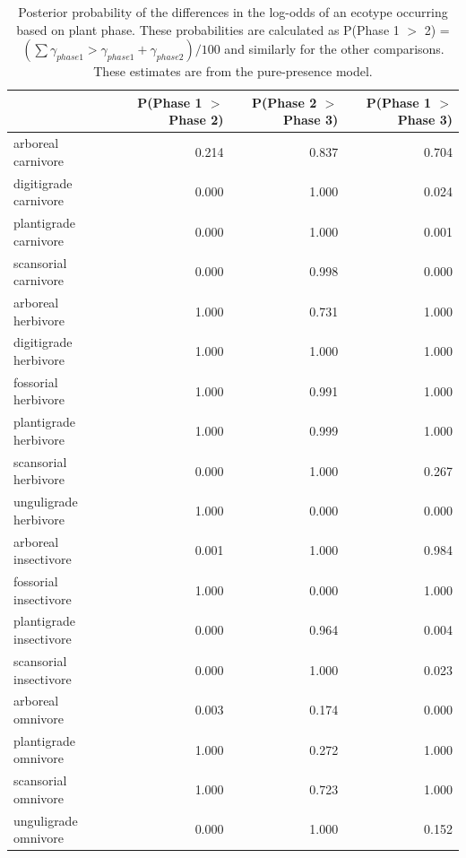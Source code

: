 \documentclass[12pt,letterpaper]{article}
\begin{document}
\begin{table}[ht]
  \centering
  \caption[Posterior probablity estimates of differences in occurrence by plant phase]{Posterior probability of the differences in the log-odds of an ecotype occurring based on plant phase. These probabilities are calculated as P(Phase 1 \(>\) 2) = \( (\sum \gamma_{phase 1} > \gamma_{phase 1} + \gamma_{phase 2}) / 100\) and similarly for the other comparisons. These estimates are from the pure-presence model.}
  \label{tab:occur_plant}
  \begin{tabular}{ l r r r }
    \hline
    & P(Phase 1 $>$ Phase 2) & P(Phase 2 $>$ Phase 3) & P(Phase 1 $>$ Phase 3) \\ 
    \hline
    arboreal carnivore & 0.214 & 0.837 & 0.704 \\ 
    digitigrade carnivore & 0.000 & 1.000 & 0.024 \\ 
    plantigrade carnivore & 0.000 & 1.000 & 0.001 \\ 
    scansorial carnivore & 0.000 & 0.998 & 0.000 \\ 
    arboreal herbivore & 1.000 & 0.731 & 1.000 \\ 
    digitigrade herbivore & 1.000 & 1.000 & 1.000 \\ 
    fossorial herbivore & 1.000 & 0.991 & 1.000 \\ 
    plantigrade herbivore & 1.000 & 0.999 & 1.000 \\ 
    scansorial herbivore & 0.000 & 1.000 & 0.267 \\ 
    unguligrade herbivore & 1.000 & 0.000 & 0.000 \\ 
    arboreal insectivore & 0.001 & 1.000 & 0.984 \\ 
    fossorial insectivore & 1.000 & 0.000 & 1.000 \\ 
    plantigrade insectivore & 0.000 & 0.964 & 0.004 \\ 
    scansorial insectivore & 0.000 & 1.000 & 0.023 \\ 
    arboreal omnivore & 0.003 & 0.174 & 0.000 \\ 
    plantigrade omnivore & 1.000 & 0.272 & 1.000 \\ 
    scansorial omnivore & 1.000 & 0.723 & 1.000 \\ 
    unguligrade omnivore & 0.000 & 1.000 & 0.152 \\ 
    \hline
  \end{tabular}
\end{table}
\end{document}
